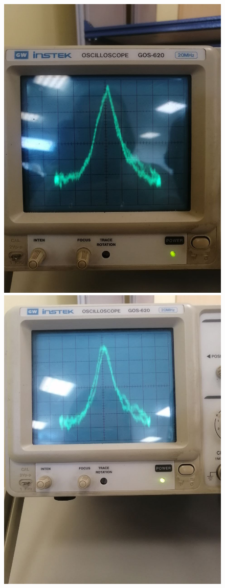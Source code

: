 \documentclass[a4paper,12pt]{article}
\begin{document}
\begin{figure}[H]
\centering
\includegraphics[scale=0.2]{line1.jpg}
\includegraphics[scale=0.2]{line2.jpg}
\end{figure}
\end{document}
